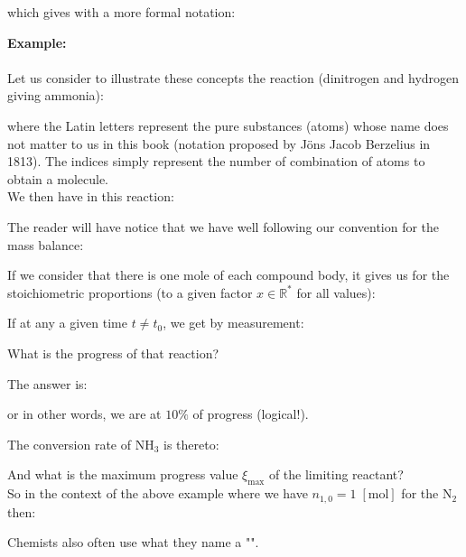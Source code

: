 	
	which gives with a more formal notation:
	
	\begin{tcolorbox}[colframe=black,colback=white,sharp corners]
	\textbf{{\Large {}}Example:}\\\\
	Let us consider to illustrate these concepts the reaction (dinitrogen and hydrogen giving ammonia):
	
	where the Latin letters represent the pure substances (atoms) whose name does not matter to us in this book (notation proposed by Jöns Jacob Berzelius in 1813). The indices simply represent the number of combination of atoms to obtain a molecule. \\

	We then have in this reaction:
	
	The reader will have notice that we have well following our convention for the mass balance:
	
	If we consider that there is one mole of each compound body, it gives us for the stoichiometric proportions (to a given factor $x\in\mathbb{R}^{*}$ for all values):
	
	If at any a given time $t\neq t_0$, we get by measurement:
	
	What is the progress of that reaction?

	The answer is:
	
	or in other words, we are at $10\%$ of progress (logical!).\\
	\end{tcolorbox}
	
	\begin{tcolorbox}[colframe=black,colback=white,sharp corners]
	The conversion rate of $\mathrm{NH}_3$ is thereto:
	
	And what is the maximum progress value $\xi_{\max}$ of the limiting reactant?\\

	So in the context of the above example where we have $n_{1,0}=1\;[\text{mol}]$ for the $\mathrm{N}_2$ then:
	
	\end{tcolorbox}
	
	Chemists also often use what they name a "".
	
